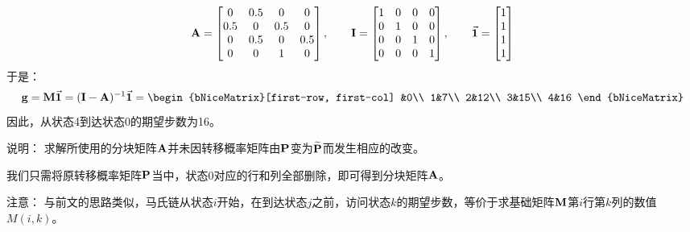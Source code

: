 \documentclass[t]{beamer}
\begin{document}
\begin{frame}{}
    \[{\bf A}=\begin{bmatrix}
        0&0.5&0&0\\
    0.5&0&0.5&0\\
    0&0.5&0&0.5\\
    0&0&1&0\\
    \end{bmatrix},\qquad {\bf I}=\begin{bmatrix}
        1&0&0&0\\
        0&1&0&0\\
        0&0&1&0\\
        0&0&0&1\\
    \end{bmatrix},\qquad {\vec{\bf 1}}=\begin{bmatrix}
        1\\1\\1\\1\\
    \end{bmatrix}\]
    于是：
    \[{\bf g}={\bf M}{\vec{\bf 1}}=({\bf I}-{\bf A})^{-1}{\vec{\bf 1}}=\begin{bNiceMatrix}[first-row, first-col]
        &0\\
        1&7\\
        2&12\\
        3&15\\
        4&16
    \end{bNiceMatrix} \]
    因此，从状态4到达状态0的期望步数为16。
\end{frame}

\begin{frame}{说明：}
求解所使用的分块矩阵${\bf A}$并未因转移概率矩阵由${\bf P}$变为$\widetilde{\bf P}$而发生相应的改变。

我们只需将原转移概率矩阵${\bf P}$当中，状态0对应的行和列全部删除，即可得到分块矩阵${\bf A}$。

\begin{block}{注意：}
    与前文的思路类似，马氏链从状态$i$开始，在到达状态$j$之前，访问状态$k$的期望步数，等价于求基础矩阵${\bf M}$第$i$行第$k$列的数值$M(i,k)$。
\end{block}
\end{frame}
\end{document}
